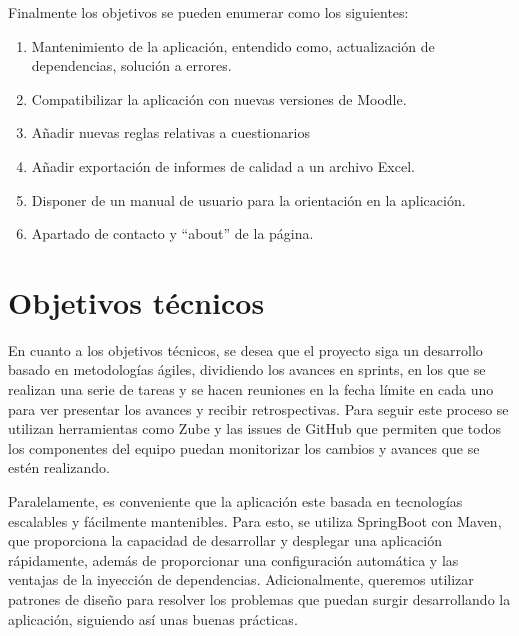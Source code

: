 Finalmente los objetivos se pueden enumerar como los siguientes:
\begin{enumerate}
    \item Mantenimiento de la aplicación, entendido como, actualización de dependencias, solución a errores.
    \item Compatibilizar la aplicación con nuevas versiones de Moodle.
    \item Añadir nuevas reglas relativas a cuestionarios
    \item Añadir exportación de informes de calidad a un archivo Excel.
    \item Disponer de un manual de usuario para la orientación en la aplicación.
    \item Apartado de contacto y ``about'' de la página.
\end{enumerate}

\section{Objetivos técnicos}
En cuanto a los objetivos técnicos, se desea que el proyecto siga un desarrollo basado en metodologías ágiles, dividiendo los avances en sprints, en los que se realizan una serie de tareas y se hacen reuniones en la fecha límite en cada uno para ver presentar los avances y recibir retrospectivas. Para seguir este proceso se utilizan herramientas como Zube y las issues de GitHub que permiten que todos los componentes del equipo puedan monitorizar los cambios y avances que se estén realizando. 

Paralelamente, es conveniente que la aplicación este basada en tecnologías escalables y fácilmente mantenibles. Para esto, se utiliza SpringBoot con Maven, que proporciona la capacidad de desarrollar y desplegar una aplicación rápidamente, además de proporcionar una configuración automática y las ventajas de la inyección de dependencias. Adicionalmente, queremos utilizar patrones de diseño para resolver los problemas que puedan surgir desarrollando la aplicación, siguiendo así unas buenas prácticas.
